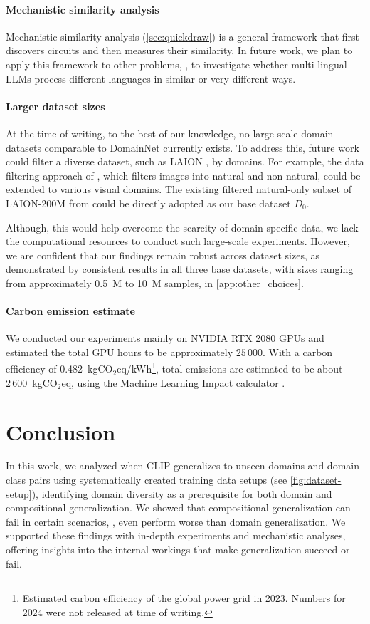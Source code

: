 \paragraph{Mechanistic similarity analysis}
Mechanistic similarity analysis (\cref{sec:quickdraw}) is a general framework that first discovers circuits and then measures their similarity. In future work, we plan to apply this framework to other problems, \eg, to investigate whether multi-lingual LLMs process different languages in similar or very different ways.

\paragraph{Larger dataset sizes}
At the time of writing, to the best of our knowledge, no large-scale domain datasets comparable to DomainNet currently exists. To address this, future work could filter a diverse dataset, such as LAION \citep{schuhmann2021laion}, by domains. For example, the data filtering approach of \citet{mayilvahanan2024search}, which filters images into natural and non-natural, could be extended to various visual domains. The existing filtered natural-only subset of LAION-200M from \citeauthor{mayilvahanan2024search} could be directly adopted as our base dataset $D_0$.

Although, this would help overcome the scarcity of domain-specific data, we lack the computational resources to conduct such large-scale experiments. However, we are confident that our findings remain robust across dataset sizes, as demonstrated by consistent results in all three base datasets, with sizes ranging from approximately 0.5~M to 10~M samples, in \cref{app:other_choices}.

\paragraph{Carbon emission estimate}
We conducted our experiments mainly on NVIDIA RTX 2080 GPUs and estimated the total GPU hours to be approximately $25\,000$. With a carbon efficiency of 0.482~kgCO$_2$eq/kWh\footnote{Estimated carbon efficiency of the global power grid in 2023. Numbers for 2024 were not released at time of writing.}, total emissions are estimated to be about $2\,600$~kgCO$_2$eq, using the \href{https://mlco2.github.io/impact#compute}{Machine Learning Impact calculator} \citep{lacoste2019quantifying}.

\section{Conclusion}
In this work, we analyzed when CLIP generalizes to unseen domains and domain-class pairs using systematically created training data setups (see \cref{fig:dataset-setup}), identifying domain diversity as a prerequisite for both domain and compositional generalization. We showed that compositional generalization can fail in certain scenarios, \ie, even perform worse than domain generalization. We supported these findings with in-depth experiments and mechanistic analyses, offering insights into the internal workings that make generalization succeed or fail.